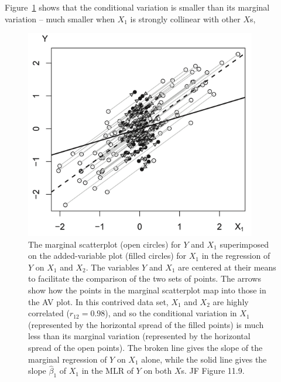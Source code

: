 Figure~\ref{fig:avp} shows that the conditional variation is smaller than its marginal variation -- much smaller  when $X_1$ is strongly collinear with other $X$s, 
%
\begin{figure}[H]
\begin{center}
  \includegraphics[width=0.9\textwidth]{Lecture17/JF_11_9}
  \caption{
  The marginal scatterplot (open circles) for $Y$ and $X_1$ superimposed on the added-variable plot (filled circles) for $X_1$ in the regression of $Y$ on $X_1$ and $X_2$.
  The variables $Y$ and $X_1$ are centered at their means to facilitate the comparison of the two sets of points.
  The arrows show how the points in the marginal scatterplot map into those in the AV plot.
  In this contrived data set, $X_1$ and $X_2$ are highly correlated ($r_{12} = 0.98$), and so the conditional variation in $X_1$ (represented by the horizontal spread of the filled points) is much less than its marginal variation (represented by the horizontal spread of the open points).
  The broken line gives the slope of the marginal regression of $Y$ on $X_1$ alone, while the solid line gives the slope $\hat{\beta}_1$ of $X_1$ in the MLR of $Y$ on both $X$s.
   JF Figure 11.9.}
  \label{fig:avp}
\end{center}
\end{figure}
%

